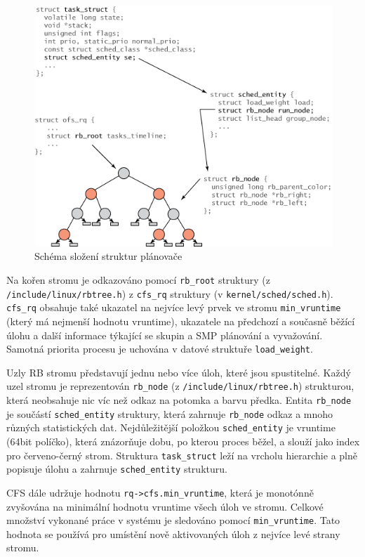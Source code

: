 \documentclass[a4paper,12pt]{article}
\begin{document}
\begin{figure}[ht]
\includegraphics[scale=1]{obrazky/schedulerStructures.png}
\caption{Schéma složení struktur plánovače}
\label{idealni procesor}
\end{figure}


Na kořen stromu je odkazováno pomocí \verb#rb_root# struktury \linebreak (z \verb#/include/linux/rbtree.h#) z \verb#cfs_rq# struktury (v \verb#kernel/sched/sched.h#).
\verb#cfs_rq# obsahuje také ukazatel na nejvíce levý prvek ve stromu \verb#min_vruntime# (který má nejmenší hodnotu vruntime), ukazatele na předchozí a současně běžící úlohu a další informace týkající se skupin a SMP plánování a vyvažování. Samotná priorita procesu je uchována v datové struktuře \verb#load_weight#. 

Uzly RB stromu představují jednu nebo více úloh, které jsou spustitelné. Každý uzel stromu je reprezentován \verb#rb_node# (z \verb#/include/linux/rbtree.h#) strukturou, která neobsahuje nic víc než odkaz na potomka a barvu předka. Entita \verb#rb_node# je součástí \verb#sched_entity# struktury, která zahrnuje \verb#rb_node# odkaz a mnoho různých statistických dat. Nejdůležitější položkou \verb#sched_entity# je vruntime (64bit políčko), která znázorňuje dobu, po kterou proces běžel, a slouží jako index pro červeno-černý strom. Struktura \verb#task_struct# leží na vrcholu hierarchie a plně popisuje úlohu a zahrnuje \verb#sched_entity# strukturu. 

CFS dále udržuje hodnotu \verb#rq->cfs.min_vruntime#, která je monotónně zvyšována na minimální hodnotu vruntime všech úloh ve stromu. Celkové množství vykonané práce v systému je sledováno pomocí \verb#min_vruntime#. Tato hodnota se používá pro umístění nově aktivovaných úloh z nejvíce levé strany stromu.
\end{document}
